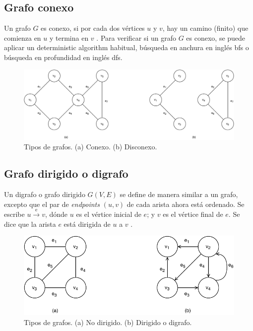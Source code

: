 \subsection{Grafo conexo}
Un grafo \( G \) es conexo, si por cada dos vértices \( u \) y \( v \), hay un camino (finito) que comienza en \( u \) y termina en \( v \) \cite{even2011graph}. Para verificar si un grafo \( G \) es conexo, se puede aplicar un \gls{deterministic algorithm} habitual, búsqueda en anchura en inglés \acrfull{bfs} o búsqueda en profundidad en inglés \acrfull{dfs}.

\begin{figure}[H]
	\centering
	\includegraphics[width=1\linewidth]{document/GraphTheory/images/connected-disconnected-graph}
	\caption{Tipos de grafos. (a) Conexo. (b) Disconexo.}
	\label{fig:connected-disconnected-graph}
\end{figure}

\subsection{Grafo dirigido o digrafo}
Un digrafo o grafo dirigido \( G(V,E) \) se define de manera similar a un grafo, excepto que el par de \textit{\gls{endpoints}} \( (u, v) \) de cada arista ahora está ordenado. Se escribe \( u \xrightarrow{\text{e}} v \), dónde \( u \) es el vértice inicial de \( e \); y \( v \) es el vértice final de \( e \). Se dice que la arista \( e \) está dirigida de \( u \) a \( v \) \cite{even2011graph}.

\begin{figure}[H]
	\centering
	\includegraphics[width=0.6\linewidth]{document/GraphTheory/images/directed-undirected-graph}
	\caption{Tipos de grafos. (a) No dirigido. (b) Dirigido o digrafo. }
	\label{fig:directed-undirected-graph}
\end{figure}